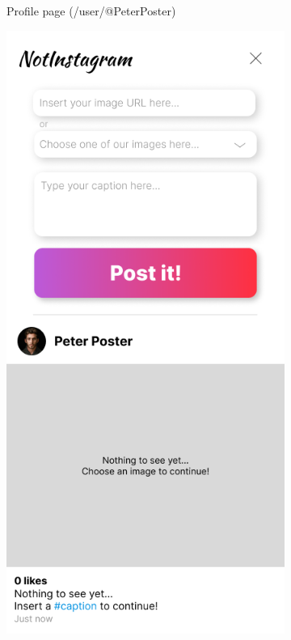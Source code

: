\documentclass[a4paper, 12pt]{article}
\begin{document}
\begin{figure}[ht!]
\begin{subfigure}{0.49\linewidth}
\begin{center}
    \end{center}
    \caption{Profile page (/user/@PeterPoster)}\label{subfig:user}
  \end{subfigure}
  \begin{subfigure}{0.49\linewidth}
    \begin{center}
      \includegraphics[width=\linewidth, height=0.3\textheight, keepaspectratio,frame]{img/ig-clone/Beitrag erstellen.png}

\end{center}
\end{subfigure}
\end{figure}
\end{document}
